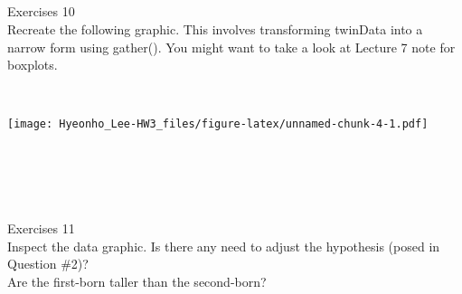 \documentclass[]{article}
\newenvironment{Shaded}{\begin{snugshade}}{\end{snugshade}}
\newcommand{\KeywordTok}[1]{\textcolor[rgb]{0.13,0.29,0.53}{\textbf{#1}}}
\newcommand{\DataTypeTok}[1]{\textcolor[rgb]{0.13,0.29,0.53}{#1}}
\newcommand{\DecValTok}[1]{\textcolor[rgb]{0.00,0.00,0.81}{#1}}
\newcommand{\StringTok}[1]{\textcolor[rgb]{0.31,0.60,0.02}{#1}}
\newcommand{\OperatorTok}[1]{\textcolor[rgb]{0.81,0.36,0.00}{\textbf{#1}}}
\newcommand{\NormalTok}[1]{#1}
\begin{document}
\subsection{~}\label{section-3}

~

~

Exercises 10\\
Recreate the following graphic. This involves transforming twinData into
a narrow form using gather(). You might want to take a look at Lecture 7
note for boxplots.

~

\begin{Shaded}
\end{Shaded}

\texttt{[image: Hyeonho\_Lee-HW3\_files/figure-latex/unnamed-chunk-4-1.pdf]}

\section{~}\label{section-4}

Exercises 11\\
Inspect the data graphic. Is there any need to adjust the hypothesis
(posed in Question \#2)?\\
Are the first-born taller than the second-born?
\end{document}
